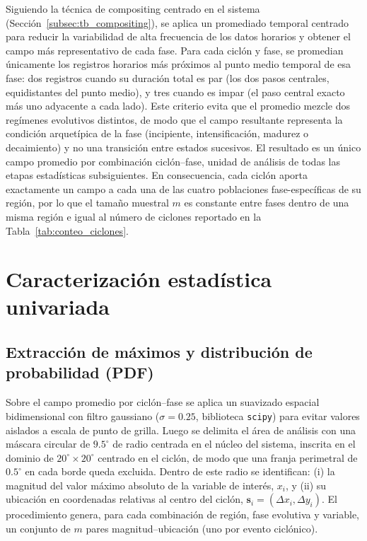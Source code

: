 Siguiendo la técnica de compositing centrado en el sistema (Sección~\ref{subsec:tb_compositing}), se aplica un promediado temporal centrado para reducir la variabilidad de alta frecuencia de los datos horarios y obtener el campo más representativo de cada fase. Para cada ciclón y fase, se promedian únicamente los registros horarios más próximos al punto medio temporal de esa fase: dos registros cuando su duración total es par (los dos pasos centrales, equidistantes del punto medio), y tres cuando es impar (el paso central exacto más uno adyacente a cada lado). Este criterio evita que el promedio mezcle dos regímenes evolutivos distintos, de modo que el campo resultante representa la condición arquetípica de la fase (incipiente, intensificación, madurez o decaimiento) y no una transición entre estados sucesivos. El resultado es un único campo promedio por combinación ciclón--fase, unidad de análisis de todas las etapas estadísticas subsiguientes. En consecuencia, cada ciclón aporta exactamente un campo a cada una de las cuatro poblaciones fase-específicas de su región, por lo que el tamaño muestral $m$ es constante entre fases dentro de una misma región e igual al número de ciclones reportado en la Tabla~\ref{tab:conteo_ciclones}.


\section{Caracterización estadística univariada}\label{sec:tecnicas_estadisticas}

\subsection{Extracción de máximos y distribución de probabilidad (PDF)}\label{subsec:extraccion_pdf}

Sobre el campo promedio por ciclón--fase se aplica un suavizado espacial bidimensional con filtro gaussiano ($\sigma = 0.25$, biblioteca \texttt{scipy}) para evitar valores aislados a escala de punto de grilla. Luego se delimita el área de análisis con una máscara circular de $9.5^{\circ}$ de radio centrada en el núcleo del sistema, inscrita en el dominio de $20^{\circ} \times 20^{\circ}$ centrado en el ciclón, de modo que una franja perimetral de $0.5^{\circ}$ en cada borde queda excluida. Dentro de este radio se identifican: (i) la magnitud del valor máximo absoluto de la variable de interés, $x_i$, y (ii) su ubicación en coordenadas relativas al centro del ciclón, $\mathbf{s}_i = (\Delta x_i, \Delta y_i)$. El procedimiento genera, para cada combinación de región, fase evolutiva y variable, un conjunto de $m$ pares magnitud--ubicación (uno por evento ciclónico).

